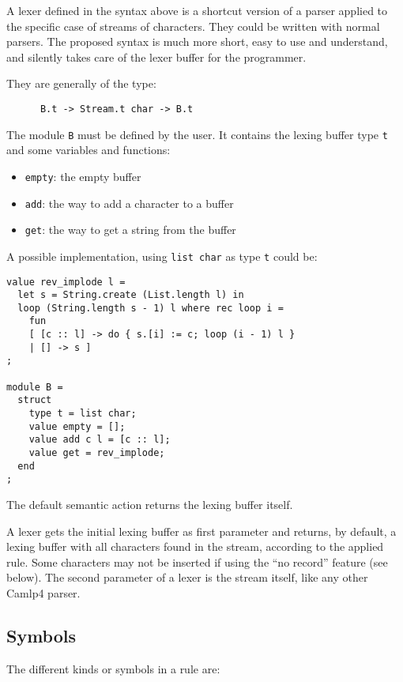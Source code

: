 \documentclass[11pt]{article}
\begin{document}
A lexer defined in the syntax above is a shortcut version of a parser
applied to the specific case of streams of characters. They could be
written with normal parsers. The proposed syntax is much more short,
easy to use and understand, and silently takes care of the lexer
buffer for the programmer.

They are generally of the type:

\begin{verbatim}
      B.t -> Stream.t char -> B.t
\end{verbatim}

The module \verb/B/ must be defined by the user. It contains the
lexing buffer type \verb/t/ and some variables and functions:

\begin{itemize}
\item \verb/empty/: the empty buffer
\item \verb/add/: the way to add a character to a buffer
\item \verb/get/: the way to get a string from the buffer
\end{itemize}

A possible implementation, using \verb/list char/ as type \verb/t/ could be:

\begin{verbatim}
value rev_implode l =
  let s = String.create (List.length l) in
  loop (String.length s - 1) l where rec loop i =
    fun
    [ [c :: l] -> do { s.[i] := c; loop (i - 1) l }
    | [] -> s ]
;

module B =
  struct
    type t = list char;
    value empty = [];
    value add c l = [c :: l];
    value get = rev_implode;
  end
;
\end{verbatim}

The default semantic action returns the lexing buffer itself.

A lexer gets the initial lexing buffer as first parameter and returns,
by default, a lexing buffer with all characters found in the stream,
according to the applied rule. Some characters may not be inserted if
using the ``no record'' feature (see below). The second parameter of
a lexer is the stream itself, like any other Camlp4 parser.

\subsection{Symbols}

The different kinds or symbols in a rule are:
\end{document}
